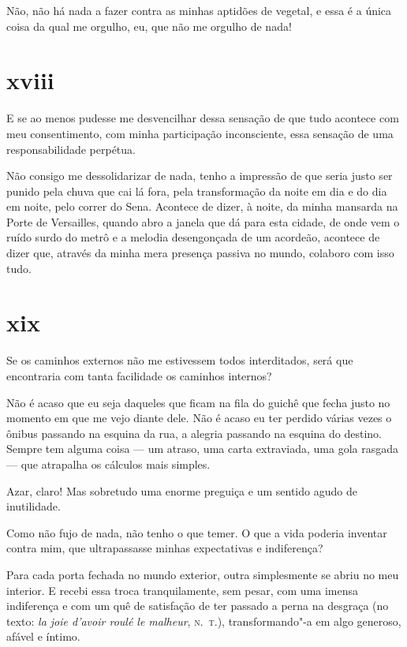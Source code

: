 Não, não há nada a fazer contra as minhas aptidões de vegetal, e essa é
a única coisa da qual me orgulho, eu, que não me orgulho de nada!

\section{xviii}

E se ao menos pudesse me desvencilhar dessa sensação de que
tudo acontece com meu consentimento, com minha participação
inconsciente, essa sensação de uma responsabilidade perpétua.

Não consigo me dessolidarizar de nada, tenho a impressão de que seria
justo ser punido pela chuva que cai lá fora, pela transformação da
noite em dia e do dia em noite, pelo correr do Sena. Acontece de
dizer, à noite, da minha mansarda na Porte de Versailles, quando abro a
janela que dá para esta cidade, de onde vem o ruído surdo do metrô e a
melodia desengonçada de um acordeão, acontece de dizer que, através
da minha mera presença passiva no mundo, colaboro com isso tudo.

\section{xix}

Se os caminhos externos não me estivessem todos interditados, será que
encontraria com tanta facilidade os caminhos internos?

Não é acaso que eu seja daqueles que ficam na fila do guichê que fecha
justo no momento em que me vejo diante dele. Não é acaso eu ter perdido
várias vezes o ônibus passando na esquina da rua, a
alegria passando na esquina do destino. Sempre tem alguma coisa --- um
atraso, uma carta extraviada, uma gola rasgada --- que
atrapalha os cálculos mais simples.

Azar, claro! Mas sobretudo uma enorme preguiça e um sentido agudo de
inutilidade.

Como não fujo de nada, não tenho o que temer. O que a vida poderia
inventar contra mim, que ultrapassasse minhas expectativas e indiferença?

Para cada porta fechada no mundo exterior, outra simplesmente se abriu
no meu interior. E recebi essa troca tranquilamente, sem pesar, com uma
imensa indiferença e com um quê de satisfação de ter
passado a perna na desgraça (no texto: \emph{la joie d'avoir roulé le
malheur}, \textsc{n.~t.}), transformando"-a em algo generoso, afável e íntimo.

